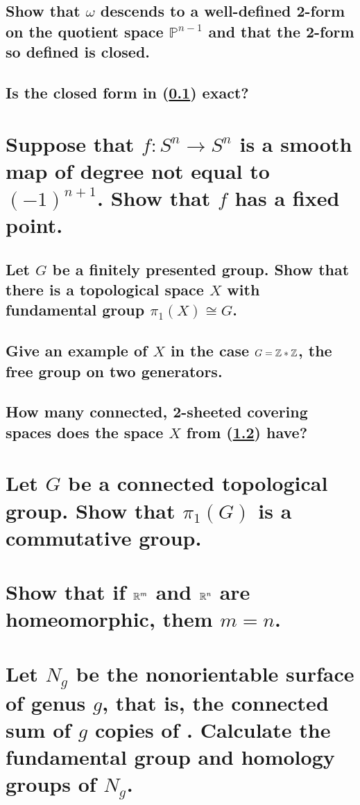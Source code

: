 \documentclass[10pt]{article}
\begin{document}
\subsection{Show that $\omega$ descends to a well-defined 2-form on the quotient space
  $\mathbb{P}^{n-1}$ and that the 2-form so defined is closed.}
\label{5c}
\subsection{Is the closed form in (\ref{5c}) exact?}
\section*{  }
\label{5d}

\section{Suppose that $f: S^n \to S^n$ is a smooth map of degree not equal to $(-1)^{n+1}$. Show
  that $f$ has a fixed point.}

\advsection
\subsection{Let $G$ be a finitely presented group. Show that there is a topological space $X$ with
  fundamental group $\pi_1(X) \cong G$.}
\subsection{Give an example of $X$ in the case $G = \mathbb{Z} * \mathbb{Z}$, the free group on two generators.}
\label{7b}
\subsection{How many connected, 2-sheeted covering spaces does the space $X$ from (\ref{7b}) have?}

\section{Let $G$ be a connected topological group. Show that $\pi_1(G)$ is a commutative group.}

\section{Show that if $\mathbb{R}^m$ and $\mathbb{R}^n$ are homeomorphic, them $m = n$.}

\section{Let $N_g$ be the nonorientable surface of genus $g$, that is, the connected sum of $g$
  copies of . Calculate the fundamental group and homology groups of $N_g$.}
\end{document}
